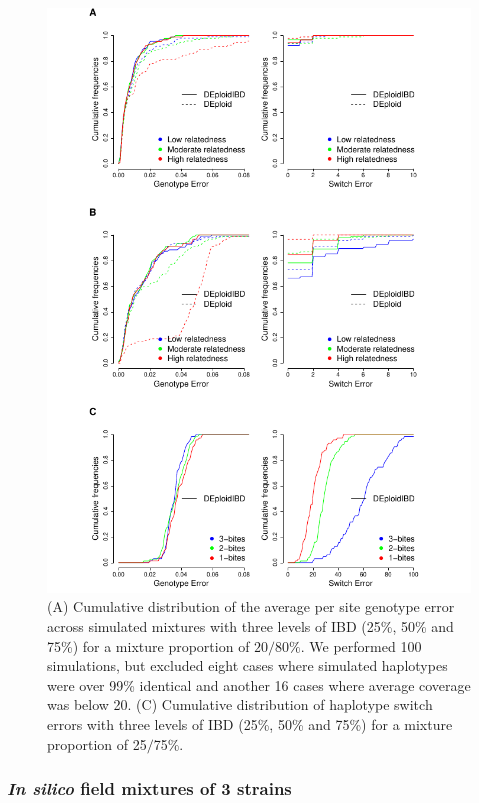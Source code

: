 \documentclass[9pt,lineno]{elife}
\begin{document}
\begin{figure}[htp]
  \begin{center}
    \includegraphics[width=\textwidth]{Fig3.pdf}
    \caption{  (A) Cumulative distribution of the average per site genotype error across simulated mixtures with three levels of IBD (25\%, 50\% and 75\%) for a mixture proportion of $20/80\%$. We performed 100 simulations, but excluded eight cases where simulated haplotypes were over 99\% identical and another 16 cases where average coverage was below 20.  (C) Cumulative distribution of haplotype switch errors with three levels of IBD (25\%, 50\% and 75\%) for a mixture proportion of 25$\slash$75\%.
} \label{fig:error-analysis}
  \end{center}
\end{figure}

\subsubsection{{\it In silico} field mixtures of 3 strains}
\end{document}
